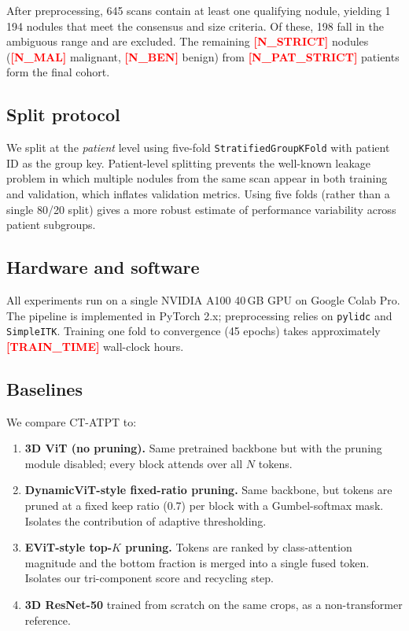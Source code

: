 \documentclass[journal]{IEEEtran}
\newcommand{\R}[1]{\textcolor{red}{\textbf{[#1]}}}
\begin{document}
After preprocessing, 645 scans contain at least one qualifying nodule, yielding
1\,194 nodules that meet the consensus and size criteria. Of these, 198 fall
in the ambiguous range and are excluded. The remaining \R{N\_STRICT} nodules
(\R{N\_MAL} malignant, \R{N\_BEN} benign) from \R{N\_PAT\_STRICT} patients
form the final cohort.

\subsection{Split protocol}
We split at the \emph{patient} level using five-fold
\texttt{StratifiedGroupKFold} with patient ID as the group key. Patient-level
splitting prevents the well-known leakage problem in which multiple nodules
from the same scan appear in both training and validation, which inflates
validation metrics. Using five folds (rather than a single 80/20 split) gives
a more robust estimate of performance variability across patient subgroups.

\subsection{Hardware and software}
All experiments run on a single NVIDIA A100 40\,GB GPU on Google Colab Pro.
The pipeline is implemented in PyTorch 2.x; preprocessing relies on
\texttt{pylidc} and \texttt{SimpleITK}. Training one fold to convergence
(45 epochs) takes approximately \R{TRAIN\_TIME} wall-clock hours.

\subsection{Baselines}
We compare CT-ATPT to:
\begin{enumerate}
    \item \textbf{3D ViT (no pruning).} Same pretrained backbone but with the
    pruning module disabled; every block attends over all $N$ tokens.
    \item \textbf{DynamicViT-style fixed-ratio pruning.} Same backbone, but
    tokens are pruned at a fixed keep ratio (0.7) per block with a
    Gumbel-softmax mask. Isolates the contribution of adaptive thresholding.
    \item \textbf{EViT-style top-$K$ pruning.} Tokens are ranked by
    class-attention magnitude and the bottom fraction is merged into a single
    fused token. Isolates our tri-component score and recycling step.
    \item \textbf{3D ResNet-50} trained from scratch on the same crops, as a
    non-transformer reference.
\end{enumerate}
\end{document}

